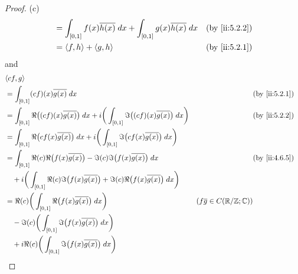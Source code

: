 \begin{proof}{(c)}
\begin{align*}
     & = \int_{[0, 1]} f(x) \overline{h(x)} \; dx + \int_{[0, 1]} g(x) \overline{h(x)} \; dx                                               &                                                      & \by{ii:5.2.2} \\
     & = \inner*{f, h} + \inner*{g, h}                                                                                                     &                                                      & \by{ii:5.2.1}
  \end{align*}
  and
  \begin{align*}
     & \inner*{cf, g}                                                                                                                                                                                      \\
     & = \int_{[0, 1]} (cf)(x) \overline{g(x)} \; dx                                                                                                &                                      & \by{ii:5.2.1} \\
     & = \int_{[0, 1]} \Re\big((cf)(x) \overline{g(x)}\big) \; dx + i \bigg(\int_{[0, 1]} \Im\big((cf)(x) \overline{g(x)}\big) \; dx\bigg)          &                                      & \by{ii:5.2.2} \\
     & = \int_{[0, 1]} \Re\big(cf(x) \overline{g(x)}\big) \; dx + i \bigg(\int_{[0, 1]} \Im\big(cf(x) \overline{g(x)}\big) \; dx\bigg)                                                                     \\
     & = \int_{[0, 1]} \Re(c) \Re\big(f(x) \overline{g(x)}\big) - \Im(c) \Im\big(f(x) \overline{g(x)}\big) \; dx                                    &                                      & \by{ii:4.6.5} \\
     & \quad + i \bigg(\int_{[0, 1]} \Re(c) \Im\big(f(x) \overline{g(x)}\big) + \Im(c) \Re\big(f(x) \overline{g(x)}\big) \; dx\bigg)                                                                       \\
     & = \Re(c) \bigg(\int_{[0, 1]} \Re\big(f(x) \overline{g(x)}\big) \; dx\bigg)                                                                   & (f \overline{g} \in C(\R / \Z ; \C))                 \\
     & \quad - \Im(c) \bigg(\int_{[0, 1]} \Im\big(f(x) \overline{g(x)}\big) \; dx\bigg)                                                                                                                    \\
     & \quad + i \Re(c) \bigg(\int_{[0, 1]} \Im\big(f(x) \overline{g(x)}\big) \; dx\bigg)                                                                                                                  \\

\end{align*}
\end{proof}
